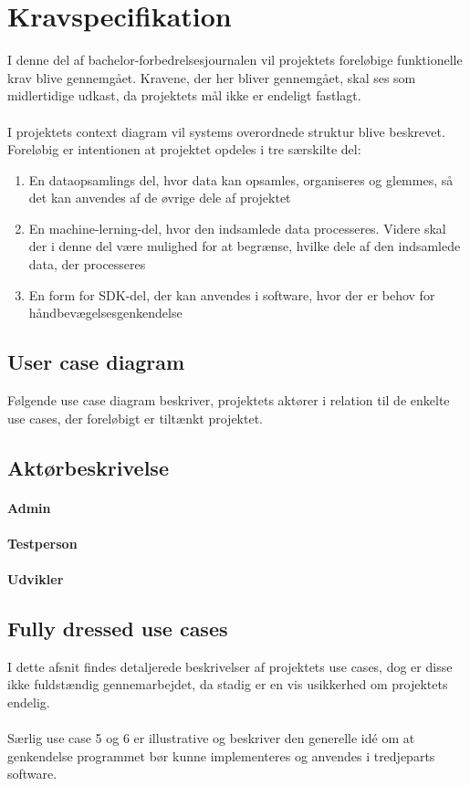 \thispagestyle{fancy}
\chapter{Kravspecifikation}
I denne del af bachelor-forbedrelsesjournalen vil projektets foreløbige funktionelle krav blive gennemgået. Kravene, der her bliver gennemgået, skal ses som midlertidige udkast, da projektets mål ikke er endeligt fastlagt.
\\ \\
I projektets context diagram vil systems overordnede struktur blive beskrevet. \\
Foreløbig er intentionen at projektet opdeles i tre særskilte del:\\
\begin{enumerate}
	\item En dataopsamlings del, hvor data kan opsamles, organiseres og glemmes, så det kan anvendes af de øvrige dele af projektet
	\item En machine-lerning-del, hvor den indsamlede data processeres. Videre skal der i denne del være mulighed for at begrænse, hvilke dele af den indsamlede data, der processeres
	\item En form for SDK-del, der kan anvendes i software, hvor der er behov for håndbevægelsesgenkendelse
	
\end{enumerate}
\section{User case diagram}
Følgende use case diagram beskriver, projektets aktører i relation til de enkelte use cases, der foreløbigt er tiltænkt projektet.

\section{Aktørbeskrivelse}
\subsubsection*{Admin}
\subsubsection*{Testperson}
\subsubsection*{Udvikler}

\section{Fully dressed use cases}
I dette afsnit findes detaljerede beskrivelser af projektets use cases, dog er disse ikke fuldstændig gennemarbejdet, da stadig er en vis usikkerhed om projektets endelig.
\\ \\Særlig use case 5 og 6 er illustrative og beskriver den generelle idé om at genkendelse programmet bør kunne implementeres og anvendes i tredjeparts software.

